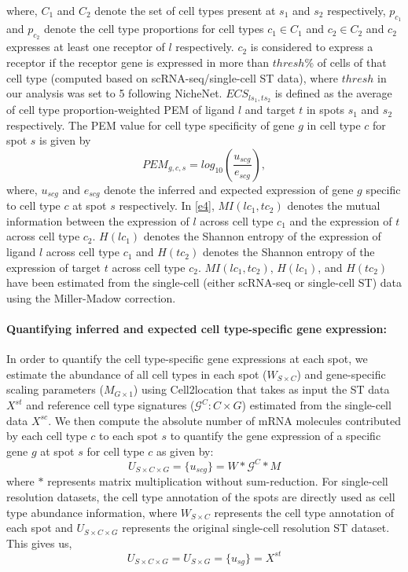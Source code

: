 where, $C_1$ and $C_2$ denote the set of cell types present at $s_1$ and $s_2$ respectively, $p_{c_1}$ and $p_{c_2}$ denote the cell type proportions for cell types $c_1 \in C_1$ and $c_2 \in C_2$ and $c_2$ expresses at least one receptor of $l$ respectively. $c_2$ is considered to express a receptor if the receptor gene is expressed in more than $thresh$\% of cells of that cell type (computed based on scRNA-seq/single-cell ST data), where $thresh$ in our analysis was set to 5 following NicheNet. $ECS_{ls_1,ts_2}$ is defined as the average of cell type proportion-weighted PEM of ligand $l$ and target $t$ in spots $s_1$ and $s_2$ respectively. The PEM value for cell type specificity of gene $g$ in cell type $c$ for spot $s$ is given by 
\begin{equation}
    PEM_{g,c,s} = log_{10}(\frac{u_{scg}}{e_{scg}}),
\end{equation}
where, $u_{scg}$ and $e_{scg}$ denote the inferred and expected expression of gene $g$ specific to cell type $c$ at spot $s$ respectively. In \cref{e4}, $MI(lc_1,tc_2)$ denotes the mutual information between the expression of $l$ across cell type $c_1$ and the expression of $t$ across cell type $c_2$. $H(lc_1)$ denotes the Shannon entropy of the expression of ligand $l$ across cell type $c_1$ and $H(tc_2)$ denotes the Shannon entropy of the expression of target $t$ across cell type $c_2$. $MI(lc_1,tc_2)$, $H(lc_1)$, and $H(tc_2)$ have been estimated from the single-cell (either scRNA-seq or single-cell ST) data using the Miller-Madow correction.

\paragraph{Quantifying inferred and expected cell type-specific gene expression:} In order to quantify the cell type-specific gene expressions at each spot, we estimate the abundance of all cell types in each spot ($W_{S \times C}$) and gene-specific scaling parameters ($M_{G \times 1}$) using Cell2location \citep{Kleshchevnikov2022} that takes as input the ST data $X^{st}$ and reference cell type signatures ($\mathcal{G}^{C}: C \times G$) estimated from the single-cell data $X^{sc}$. We then compute the absolute number of mRNA molecules contributed by each cell type $c$ to each spot $s$ to quantify the gene expression of a specific gene $g$ at spot $s$ for cell type $c$ as given by:
\begin{equation}
    U_{S \times C \times G} = \{u_{scg}\} = W*\mathcal{G}^{C}*M
\end{equation}
where $*$ represents matrix multiplication without sum-reduction. For single-cell resolution datasets, the cell type annotation of the spots are directly used as cell type abundance information, where $W_{S \times C}$ represents the cell type annotation of each spot and $U_{S \times C \times G}$ represents the original single-cell resolution ST dataset. This gives us,\\
\begin{equation}
    U_{S \times C \times G} = U_{S \times G} = \{u_{sg}\} = X^{st}
\end{equation}

